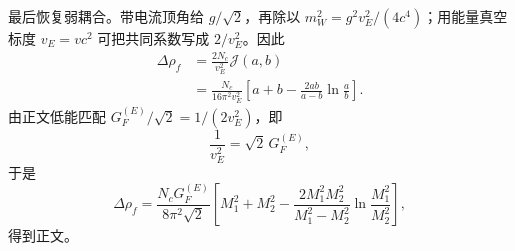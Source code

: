 \begin{derivation}
最后恢复弱耦合。带电流顶角给 $g/\sqrt2$，再除以 $m_W^2=g^2v_E^2/(4c^4)$；用能量真空标度 $v_E=v c^2$ 可把共同系数写成 $2/v_E^2$。因此
\begin{align*}
\Delta\rho_f
&=\frac{2N_c}{v_E^2}\mathcal J(a,b)\\
&=\frac{N_c}{16\pi^2v_E^2}
\left[a+b-\frac{2ab}{a-b}\ln\frac ab\right].
\end{align*}
由正文低能匹配 $G_F^{(E)}/\sqrt2=1/(2v_E^2)$，即
\begin{equation*}
\frac1{v_E^2}=\sqrt2\,G_F^{(E)},
\end{equation*}
于是
\begin{equation*}
\Delta\rho_f
=\frac{N_cG_F^{(E)}}{8\pi^2\sqrt2}
\left[
M_1^2+M_2^2-
\frac{2M_1^2M_2^2}{M_1^2-M_2^2}
\ln\frac{M_1^2}{M_2^2}
\right],
\end{equation*}
得到正文。
\end{derivation}
